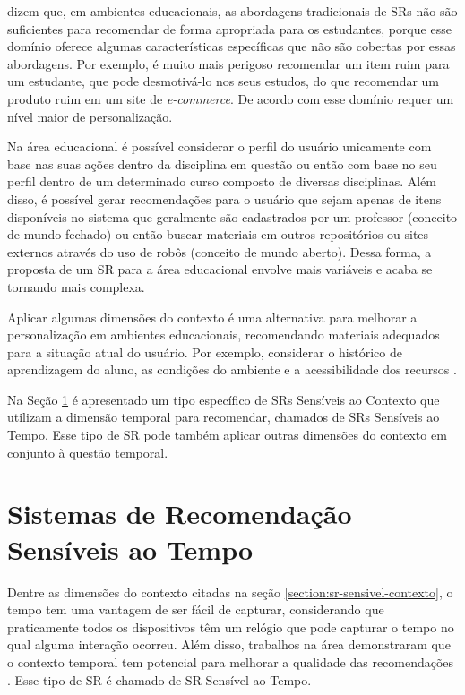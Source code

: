  dizem que, em ambientes educacionais, as abordagens tradicionais de SRs não são
suficientes para recomendar de forma apropriada para os estudantes, porque esse domínio oferece algumas características
específicas que não são cobertas por essas abordagens. Por exemplo, é muito mais perigoso recomendar um item ruim para
um estudante, que pode desmotivá-lo nos seus estudos, do que recomendar um produto ruim em um site de \textit{e-commerce}.
De acordo com  esse domínio requer um nível maior de personalização.

Na área educacional é possível considerar o perfil do usuário unicamente com base nas suas ações dentro da disciplina
em questão ou então com base no seu perfil dentro de um determinado curso composto de diversas disciplinas. Além disso,
é possível gerar recomendações para o usuário que sejam apenas de itens disponíveis no sistema que geralmente são
cadastrados por um professor (conceito de mundo fechado) ou então buscar materiais em outros repositórios ou sites
externos através do uso de robôs (conceito de mundo aberto). Dessa forma, a proposta de um SR para a área educacional
envolve mais variáveis e acaba se tornando mais complexa.

Aplicar algumas dimensões do contexto é uma alternativa para melhorar a personalização em ambientes educacionais,
recomendando materiais adequados para a situação atual do usuário. Por exemplo, considerar o histórico de aprendizagem
do aluno, as condições do ambiente e a acessibilidade dos recursos \cite{verbert2012context}.

Na Seção \ref{section:sr-sensivel-tempo} é apresentado um tipo específico de SRs Sensíveis ao Contexto que utilizam a dimensão temporal para
recomendar, chamados de SRs Sensíveis ao Tempo. Esse tipo de SR pode também aplicar outras dimensões do contexto em
conjunto à questão temporal.

\section{Sistemas de Recomendação Sensíveis ao Tempo}\label{section:sr-sensivel-tempo}

Dentre as dimensões do contexto citadas na seção \ref{section:sr-sensivel-contexto}, o tempo tem uma vantagem de ser
fácil de capturar, considerando que praticamente todos os dispositivos têm um relógio que pode capturar o tempo no qual
alguma interação ocorreu. Além disso, trabalhos na área demonstraram que o contexto temporal tem potencial para melhorar
a qualidade das recomendações \cite{campos2014time}. Esse tipo de SR é chamado de SR Sensível ao Tempo.

